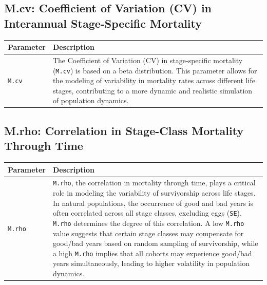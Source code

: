 \documentclass[
  letterpaper,
  DIV=11,
  numbers=noendperiod]{scrreprt}
\begin{document}
\subsection{M.cv: Coefficient of Variation (CV) in Interannual
Stage-Specific
Mortality}\label{m.cv-coefficient-of-variation-cv-in-interannual-stage-specific-mortality}

\begin{longtable}[]{@{}
  >{\raggedright\arraybackslash}p{}
  >{\raggedright\arraybackslash}p{}@{}}
\toprule\noalign{}
\begin{minipage}[b]{\linewidth}\raggedright
Parameter
\end{minipage} & \begin{minipage}[b]{\linewidth}\raggedright
Description
\end{minipage} \\
\midrule\noalign{}
\endhead
\bottomrule\noalign{}
\endlastfoot
\texttt{M.cv} & The Coefficient of Variation (CV) in stage-specific
mortality (\texttt{M.cv}) is based on a beta distribution. This
parameter allows for the modeling of variability in mortality rates
across different life stages, contributing to a more dynamic and
realistic simulation of population dynamics. \\
\end{longtable}

\subsection{M.rho: Correlation in Stage-Class Mortality Through
Time}\label{m.rho-correlation-in-stage-class-mortality-through-time}

\begin{longtable}[]{@{}
  >{\raggedright\arraybackslash}p{}
  >{\raggedright\arraybackslash}p{}@{}}
\toprule\noalign{}
\begin{minipage}[b]{\linewidth}\raggedright
Parameter
\end{minipage} & \begin{minipage}[b]{\linewidth}\raggedright
Description
\end{minipage} \\
\midrule\noalign{}
\endhead
\bottomrule\noalign{}
\endlastfoot
\texttt{M.rho} & \texttt{M.rho}, the correlation in mortality through
time, plays a critical role in modeling the variability of survivorship
across life stages. In natural populations, the occurrence of good and
bad years is often correlated across all stage classes, excluding eggs
(\texttt{SE}). \texttt{M.rho} determines the degree of this correlation.
A low \texttt{M.rho} value suggests that certain stage classes may
compensate for good/bad years based on random sampling of survivorship,
while a high \texttt{M.rho} implies that all cohorts may experience
good/bad years simultaneously, leading to higher volatility in
population dynamics. \\
\end{longtable}
\end{document}

